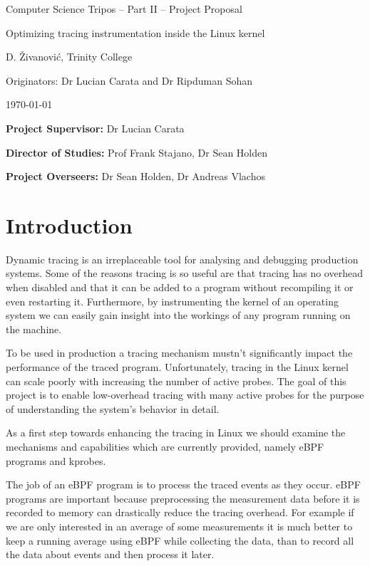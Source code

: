 \centerline{\Large Computer Science Tripos -- Part II -- Project Proposal}
\vspace{6mm}
\centerline{\Large Optimizing tracing instrumentation inside the Linux kernel}
\vspace{6mm}
\centerline{\large D. Živanović, Trinity College}
\vspace{4mm}
\centerline{\large Originators: Dr Lucian Carata and Dr Ripduman Sohan}
\vspace{4mm}
\centerline{\large \today}

\vspace{8mm}

\noindent
{\bf Project Supervisor:} Dr Lucian Carata
\vspace{2mm}

\noindent
{\bf Director of Studies:} Prof Frank Stajano, Dr Sean Holden
\vspace{2mm}
 
\noindent
{\bf Project Overseers:} Dr Sean Holden, Dr Andreas Vlachos



\section*{Introduction}

    Dynamic tracing is an irreplaceable tool for analysing and debugging production systems. 
    Some of the reasons tracing is so useful are that tracing has no overhead 
    when disabled and that it can be added to a program without recompiling it or even restarting it. 
    Furthermore, by instrumenting the kernel of an operating system we can easily gain insight into
    the workings of any program running on the machine.

    To be used in production a tracing mechanism mustn't significantly impact the performance of the 
    traced program. Unfortunately, tracing in the Linux kernel can scale poorly with increasing the number of active probes.
    The goal of this project is to enable low-overhead tracing with many active probes for the purpose of
    understanding the system's behavior in detail.

    As a first step towards enhancing the tracing in Linux we should examine the mechanisms and capabilities
    which are currently provided, namely eBPF programs and kprobes.

    The job of an eBPF program is to process the traced events as they occur.
    eBPF programs are important because preprocessing the measurement data before it is recorded to 
    memory can drastically reduce the tracing overhead. 
    For example if we are only interested in an average of some measurements it is much better to keep 
    a running average using eBPF while collecting the data, than to record all the data about events and 
    then process it later.

